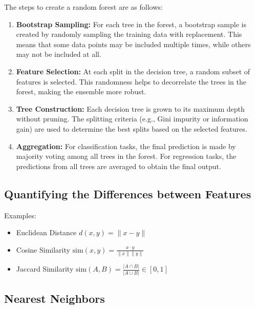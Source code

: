 The steps to create a random forest are as follows:

\begin{enumerate}

    \item \textbf{Bootstrap Sampling:} For each tree in the forest, a bootstrap sample is created by randomly sampling the training data with replacement. 
    This means that some data points may be included multiple times, while others may not be included at all.

    \item \textbf{Feature Selection:} At each split in the decision tree, a random subset of features is selected. This randomness helps to decorrelate the trees in 
    the forest, making the ensemble more robust.

    \item \textbf{Tree Construction:} Each decision tree is grown to its maximum depth without pruning. The splitting criteria (e.g., Gini impurity or information gain)
    are used to determine the best splits based on the selected features.

    \item \textbf{Aggregation:} For classification tasks, the final prediction is made by majority voting among all trees in the forest. For regression tasks, the 
    predictions from all trees are averaged to obtain the final output.

\end{enumerate}

\subsection{Quantifying the Differences between Features}

Examples:

\begin{itemize}

    \item Euclidean Distance \( d(x ,y) = \|x - y \|\)

    \item Cosine Similarity \( \text{sim}(x, y) = \frac{x \cdot y}{\|x\| \|y\|} \) 

    \item Jaccard Similarity \( \text{sim}(A, B) = \frac{|A \cap B|}{|A \cup B|} \in [0, 1] \)

\end{itemize}

\subsection{Nearest Neighbors}

